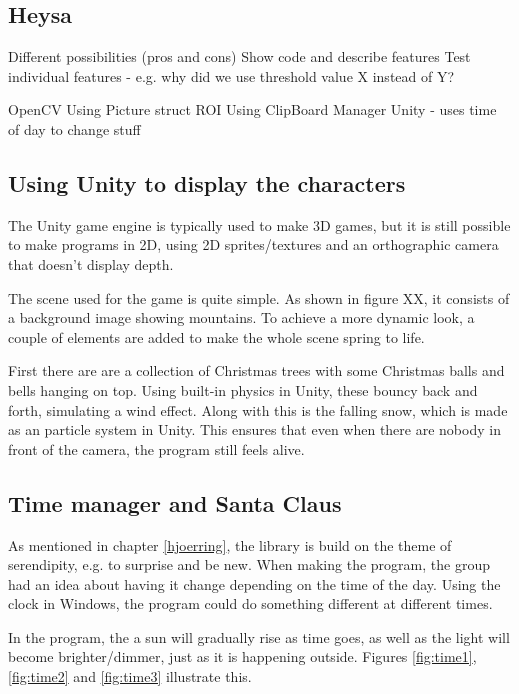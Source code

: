 \subsection{Heysa}
Different possibilities (pros and cons)
Show code and describe features
Test individual features - e.g. why did we use threshold value X instead of Y?

OpenCV
Using Picture struct
ROI
Using ClipBoard Manager
Unity - uses time of day to change stuff

\subsection{Using Unity to display the characters}
The Unity game engine is typically used to make 3D games, but it is still possible to make programs in 2D, using 2D sprites/textures and an orthographic camera that doesn't display depth.

The scene used for the game is quite simple. As shown in figure XX, it consists of a background image showing mountains. To achieve a more dynamic look, a couple of elements are added to make the whole scene spring to life.

First there are are a collection of Christmas trees with some Christmas balls and bells hanging on top. Using built-in physics in Unity, these bouncy back and forth, simulating a wind effect. Along with this is the falling snow, which is made as an particle system in Unity. This ensures that even when there are nobody in front of the camera, the program still feels alive.

\subsection{Time manager and Santa Claus}
As mentioned in chapter \ref{hjoerring}, the library is build on the theme of serendipity, e.g. to surprise and be new. When making the program, the group had an idea about having it change depending on the time of the day. Using the clock in Windows, the program could do something different at different times.

In the program, the a sun will gradually rise as time goes, as well as the light will become brighter/dimmer, just as it is happening outside. Figures \ref{fig:time1}, \ref{fig:time2} and \ref{fig:time3} illustrate this.

